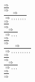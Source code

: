 \documentclass[11pt]{article}
\begin{document}
\begin{center}
\bigskip
\\$\frac{\Rightarrow }{\Rightarrow }$
\bigskip
\\$\frac{\Rightarrow }{\Rightarrow , , , , , , , }$
\bigskip
\\$\frac{\Rightarrow }{\Rightarrow }$
\bigskip
\\$\frac{\Rightarrow }{\Rightarrow , , , }$
\bigskip
\\$\frac{\Rightarrow }{\Rightarrow }$
\bigskip
\\$\frac{\Rightarrow }{\Rightarrow , , , , , , , , , }$
\bigskip
\\$\frac{\Rightarrow }{\Rightarrow }$
\bigskip
\\$\frac{\Rightarrow }{\Rightarrow , , , }$
\bigskip
\\$\frac{\Rightarrow }{\Rightarrow }$
\bigskip
\\
\end{center}
\end{document}
